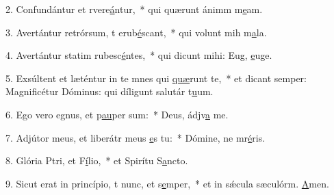2. Confundántur et rvere\uline{á}ntur,~* qui quærunt ánimm m\uline{e}am.\par 
3. Avertántur retrórsum, t erub\uline{é}scant,~* qui volunt mih m\uline{a}la.\par 
4. Avertántur statim rubesc\uline{é}ntes,~* qui dicunt mihi: Eug, \uline{e}uge.\par 
5. Exsúltent et læténtur in te mnes qui \uline{quæ}runt te,~* et dicant semper: Magnificétur Dóminus: qui díligunt salutár t\uline{u}um.\par 
6. Ego vero egnus, et p\uline{au}per sum:~* Deus, ádjv\uline{a} me.\par 
7. Adjútor meus, et liberátr meus \uline{e}s tu:~* Dómine, ne mr\uline{é}ris.\par 
8. Glória Ptri, et F\uline{í}lio,~* et Spirítu S\uline{a}ncto.\par 
9. Sicut erat in princípio, t nunc, et s\uline{e}mper,~* et in sǽcula sæculórm. \uline{A}men.\par 
